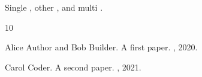 \documentclass{article}
\begin{document}
Single \cite{alpha}, other \cite{beta}, and multi \cite{alpha,beta}.


\begin{thebibliography}{10}

Alice Author and Bob Builder.
\newblock A first paper.
, 2020.

Carol Coder.
\newblock A second paper.
, 2021.

\end{thebibliography}
\end{document}
